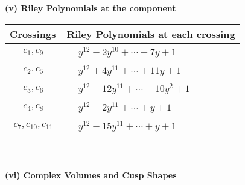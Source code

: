 \documentclass[1p]{elsarticle_modified}
\theoremstyle{definition}
\begin{document}
\newpage\renewcommand{\arraystretch}{1}
\flushleft \textbf{(v) Riley Polynomials at the component}\newline \\
\begin{tabular}{m{50pt}|m{274pt}}
Crossings & \hspace{64pt}Riley Polynomials at each crossing \\
\hline $$\begin{aligned}c_{1},c_{9}\end{aligned}$$&$\begin{aligned}
&y^{12}-2 y^{10}+\cdots-7 y+1
\end{aligned}$\\
\hline $$\begin{aligned}c_{2},c_{5}\end{aligned}$$&$\begin{aligned}
&y^{12}+4 y^{11}+\cdots+11 y+1
\end{aligned}$\\
\hline $$\begin{aligned}c_{3},c_{6}\end{aligned}$$&$\begin{aligned}
&y^{12}-12 y^{11}+\cdots-10 y^2+1
\end{aligned}$\\
\hline $$\begin{aligned}c_{4},c_{8}\end{aligned}$$&$\begin{aligned}
&y^{12}-2 y^{11}+\cdots+y+1
\end{aligned}$\\
\hline $$\begin{aligned}c_{7},c_{10},c_{11}\end{aligned}$$&$\begin{aligned}
&y^{12}-15 y^{11}+\cdots+y+1
\end{aligned}$\\
\hline
\end{tabular}\\~\\
\newpage\flushleft \textbf{(vi) Complex Volumes and Cusp Shapes}
\end{document}
